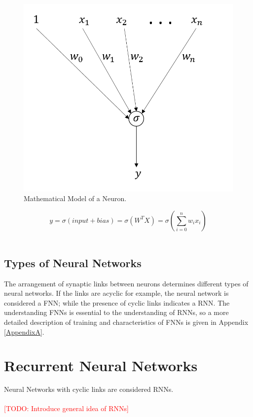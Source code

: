 \begin{figure}[h]
	\centering
	\includegraphics{Figures/neuron_mathematical_model.PNG}
	\decoRule
	\caption[Mathematical Model of a Neuron]{Mathematical Model of a Neuron.}
	\label{fig:Neuron}
\end{figure}

\begin{equation}\label{eq:3}
	y=\sigma(input + bias)=\sigma(W^{T}X)=\sigma(\sum_{i=0}^{n} w_i x_i)
\end{equation}
\\
\subsection{Types of Neural Networks}
The arrangement of synaptic links between neurons determines different types of neural networks. If the links are acyclic for example, the neural network is considered a FNN; while the presence of cyclic links indicates a RNN. The understanding FNNs is essential to the understanding of RNNs, so a more detailed description of training and characteristics of FNNs is given in Appendix \ref{AppendixA}. 





\section{Recurrent Neural Networks}
Neural Networks with cyclic links are considered RNNs.
\\\\
\textcolor{red} {[TODO: Introduce general idea of RNNs] }
